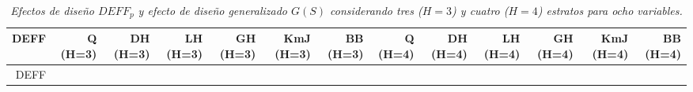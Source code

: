 \documentclass[12pt,spanish,]{book}
\begin{document}
\begin{longtable}[]{@{}rrrrrrrrrrrrr@{}}
\caption{\emph{Efectos de diseño \(DEFF_p\) y efecto de diseño generalizado \(G(S)\) considerando tres (\(H=3\)) y cuatro (\(H=4\)) estratos para ocho variables.}}\tabularnewline
\toprule
\begin{minipage}[b]{0.05\columnwidth}\raggedleft
DEFF\strut
\end{minipage} & \begin{minipage}[b]{0.05\columnwidth}\raggedleft
Q (H=3)\strut
\end{minipage} & \begin{minipage}[b]{0.06\columnwidth}\raggedleft
DH (H=3)\strut
\end{minipage} & \begin{minipage}[b]{0.05\columnwidth}\raggedleft
LH (H=3)\strut
\end{minipage} & \begin{minipage}[b]{0.05\columnwidth}\raggedleft
GH (H=3)\strut
\end{minipage} & \begin{minipage}[b]{0.06\columnwidth}\raggedleft
KmJ (H=3)\strut
\end{minipage} & \begin{minipage}[b]{0.05\columnwidth}\raggedleft
BB (H=3)\strut
\end{minipage} & \begin{minipage}[b]{0.05\columnwidth}\raggedleft
Q (H=4)\strut
\end{minipage} & \begin{minipage}[b]{0.06\columnwidth}\raggedleft
DH (H=4)\strut
\end{minipage} & \begin{minipage}[b]{0.05\columnwidth}\raggedleft
LH (H=4)\strut
\end{minipage} & \begin{minipage}[b]{0.05\columnwidth}\raggedleft
GH (H=4)\strut
\end{minipage} & \begin{minipage}[b]{0.06\columnwidth}\raggedleft
KmJ (H=4)\strut
\end{minipage} & \begin{minipage}[b]{0.05\columnwidth}\raggedleft
BB (H=4)\strut
\end{minipage}\tabularnewline
\midrule
\endfirsthead
\toprule
\begin{minipage}[b]{0.05\columnwidth}\raggedleft
DEFF\strut
\end{minipage} & \begin{minipage}[b]{0.05\columnwidth}\raggedleft

\end{minipage}
\end{longtable}
\end{document}
